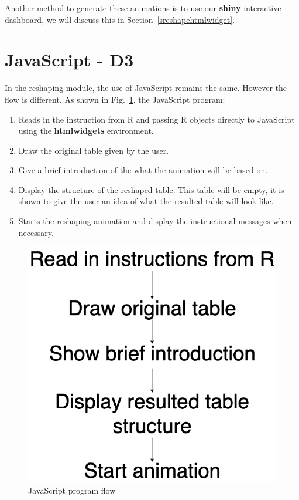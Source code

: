 Another method to generate these animations is to use our \textbf{shiny} interactive dashboard, we will discuss this in Section~\ref{sreshapehtmlwidget}.

\newpage

\section{\textsf{JavaScript} - D3}

In the reshaping module, the use of \textsf{JavaScript} remains the same. However the flow is different. As shown in Fig.~\ref{fig:jsflow2}, the \textsf{JavaScript} program:

\begin{enumerate}
    \item Reads in the instruction from \textsf{R} and passing \textsf{R} objects directly to \textsf{JavaScript} using the \textbf{htmlwidgets} environment. 
    \item Draw the original table given by the user.
    \item Give a brief introduction of the what the animation will be based on.  
    \item Display the structure of the reshaped table. This table will be empty, it is shown to give the user an idea of what the resulted table will look like.
    \item Starts the reshaping animation and display the instructional messages when necessary. 
\end{enumerate}

\begin{figure}[H]
    \centering
    \includegraphics[scale = 0.4]{Masters-Thesis/img/jsflow2.png}
    \caption{\textsf{JavaScript} program flow}
    \label{fig:jsflow2}
\end{figure}



